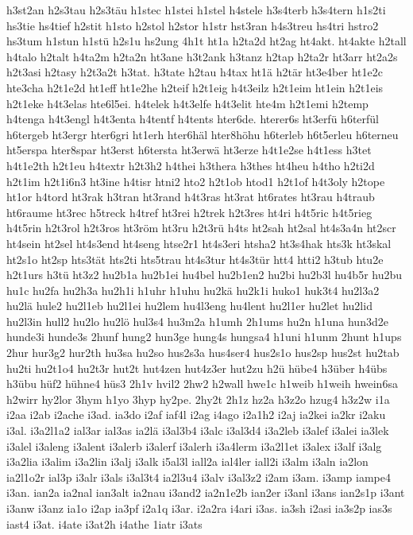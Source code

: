 {h3st2an
h2s3tau
h2s3täu
h1stec
h1stei
h1stel
h4stele
h3s4terb
h3s4tern
h1s2ti
hs3tie
hs4tief
h2stit
h1sto
h2stol
h2stor
h1str
hst3ran
h4s3treu
hs4tri
hstro2
hs3tum
h1stun
h1stü
h2s1u
hs2ung
4h1t
ht1a
h2ta2d
ht2ag
ht4akt.
ht4akte
h2tall
h4talo
h2talt
h4ta2m
h2ta2n
ht3ane
h3t2ank
h3tanz
h2tap
h2ta2r
ht3arr
ht2a2s
h2t3asi
h2tasy
h2t3a2t
h3tat.
h3tate
h2tau
h4tax
ht1ä
h2tär
ht3e4ber
ht1e2c
hte3cha
h2t1e2d
ht1eff
ht1e2he
h2teif
h2t1eig
h4t3eilz
h2t1eim
ht1ein
h2t1eis
h2t1eke
h4t3elas
hte6l5ei.
h4telek
h4t3elfe
h4t3elit
hte4m
h2t1emi
h2temp
h4tenga
h4t3engl
h4t3enta
h4tentf
h4tents
hter6de.
hterer6s
ht3erfü
h6terfül
h6tergeb
ht3ergr
hter6gri
ht1erh
hter6häl
hter8höhu
h6terleb
h6t5erleu
h6terneu
ht5erspa
hter8spar
ht3erst
h6tersta
ht3erwä
ht3erze
h4t1e2se
h4t1ess
h3tet
h4t1e2th
h2t1eu
h4textr
h2t3h2
h4thei
h3thera
h3thes
ht4heu
h4tho
h2ti2d
h2t1im
h2t1i6n3
ht3ine
h4tisr
htni2
hto2
h2t1ob
htod1
h2t1of
h4t3oly
h2tope
ht1or
h4tord
ht3rak
h3tran
ht3rand
h4t3ras
ht3rat
ht6rates
ht3rau
h4traub
ht6raume
ht3rec
h5treck
h4tref
ht3rei
h2trek
h2t3res
ht4ri
h4t5ric
h4t5rieg
h4t5rin
h2t3rol
h2t3ros
ht3röm
ht3ru
h2t3rü
h4ts
ht2sah
ht2sal
ht4s3a4n
ht2scr
ht4sein
ht2sel
ht4s3end
ht4seng
htse2r1
ht4s3eri
htsha2
ht3s4hak
hts3k
ht3skal
ht2s1o
ht2sp
hts3tät
hts2ti
hts5trau
ht4s3tur
ht4s3tür
htt4
htti2
h3tub
htu2e
h2t1urs
h3tü
ht3z2
hu2b1a
hu2b1ei
hu4bel
hu2b1en2
hu2bi
hu2b3l
hu4b5r
hu2bu
hu1c
hu2fa
hu2h3a
hu2h1i
h1uhr
h1uhu
hu2kä
hu2k1i
huko1
huk3t4
hu2l3a2
hu2lä
hule2
hu2l1eb
hu2l1ei
hu2lem
hu4l3eng
hu4lent
hu2l1er
hu2let
hu2lid
hu2l3in
hull2
hu2lo
hu2lö
hul3s4
hu3m2a
h1umh
2h1ums
hu2n
h1una
hun3d2e
hunde3i
hunde3s
2hunf
hung2
hun3ge
hung4s
hungsa4
h1uni
h1unm
2hunt
h1ups
2hur
hur3g2
hur2th
hu3sa
hu2so
hus2s3a
hus4ser4
hus2s1o
hus2sp
hus2st
hu2tab
hu2ti
hu2t1o4
hu2t3r
hut2t
hut4zen
hut4z3er
hut2zu
h2ü
hübe4
h3über
h4übs
h3übu
hüf2
hühne4
hüs3
2h1v
hvil2
2hw2
h2wall
hwe1c
h1weib
h1weih
hwein6sa
h2wirr
hy2lor
3hym
h1yo
3hyp
hy2pe.
2hy2t
2h1z
hz2a
h3z2o
hzug4
h3z2w
i1a
i2aa
i2ab
i2ache
i3ad.
ia3do
i2af
iaf4l
i2ag
i4ago
i2a1h2
i2aj
ia2kei
ia2kr
i2aku
i3al.
i3a2l1a2
ial3ar
ial3as
ia2lä
i3al3b4
i3alc
i3al3d4
i3a2leb
i3alef
i3alei
ia3lek
i3alel
i3aleng
i3alent
i3alerb
i3alerf
i3alerh
i3a4lerm
i3a2l1et
i3alex
i3alf
i3alg
i3a2lia
i3alim
i3a2lin
i3alj
i3alk
i5al3l
iall2a
ial4ler
iall2i
i3alm
i3aln
ia2lon
ia2l1o2r
ial3p
i3alr
i3als
i3al3t4
ia2l3u4
i3alv
i3al3z2
i2am
i3am.
i3amp
iampe4
i3an.
ian2a
ia2nal
ian3alt
ia2nau
i3and2
ia2n1e2b
ian2er
i3anl
i3ans
ian2s1p
i3ant
i3anw
i3anz
ia1o
i2ap
ia3pf
i2a1q
i3ar.
i2a2ra
i4ari
i3as.
ia3sh
i2asi
ia3s2p
ias3s
iast4
i3at.
i4ate
i3at2h
i4athe
1iatr
i3ats
}
